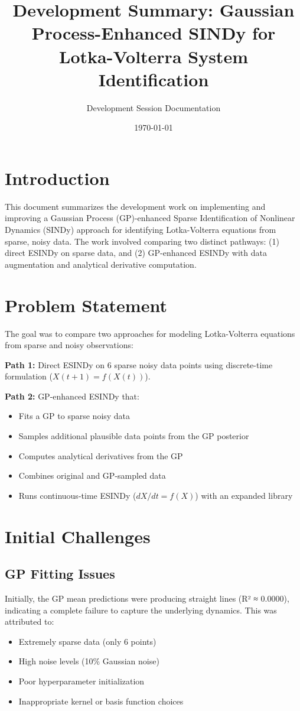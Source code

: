 \documentclass[11pt]{article}
\title{Development Summary: Gaussian Process-Enhanced SINDy for Lotka-Volterra System Identification}
\author{Development Session Documentation}
\date{\today}
\begin{document}
\maketitle

\section{Introduction}

This document summarizes the development work on implementing and improving a Gaussian Process (GP)-enhanced Sparse Identification of Nonlinear Dynamics (SINDy) approach for identifying Lotka-Volterra equations from sparse, noisy data. The work involved comparing two distinct pathways: (1) direct ESINDy on sparse data, and (2) GP-enhanced ESINDy with data augmentation and analytical derivative computation.

\section{Problem Statement}

The goal was to compare two approaches for modeling Lotka-Volterra equations from sparse and noisy observations:

\textbf{Path 1:} Direct ESINDy on 6 sparse noisy data points using discrete-time formulation ($X(t+1) = f(X(t))$).

\textbf{Path 2:} GP-enhanced ESINDy that:
\begin{itemize}
    \item Fits a GP to sparse noisy data
    \item Samples additional plausible data points from the GP posterior
    \item Computes analytical derivatives from the GP
    \item Combines original and GP-sampled data
    \item Runs continuous-time ESINDy ($dX/dt = f(X)$) with an expanded library
\end{itemize}

\section{Initial Challenges}

\subsection{GP Fitting Issues}

Initially, the GP mean predictions were producing straight lines (R² ≈ 0.0000), indicating a complete failure to capture the underlying dynamics. This was attributed to:
\begin{itemize}
    \item Extremely sparse data (only 6 points)
    \item High noise levels (10\% Gaussian noise)
    \item Poor hyperparameter initialization
    \item Inappropriate kernel or basis function choices
\end{itemize}
\end{document}
